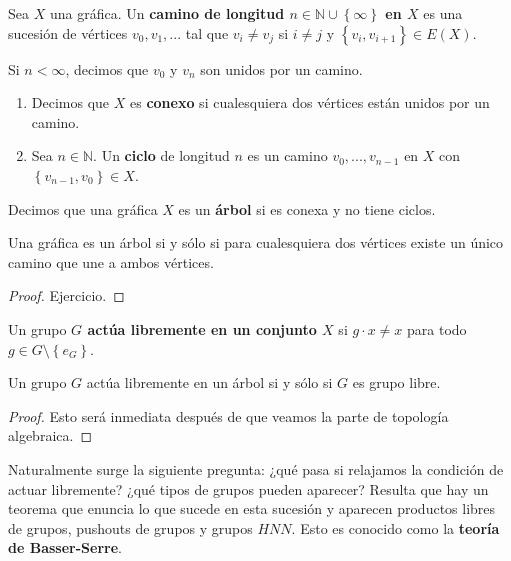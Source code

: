 \documentclass[12pt]{report}
\newcounter{it}
\theoremstyle{largebreak}
\begin{document}
    \begin{mydef}
        Sea $X$ una gráfica. Un \textbf{camino de longitud $n\in\mathbb{N}\cup\left\{\infty\right\}$ en $X$} es una sucesión de vértices $v_0,v_1,...$ tal que $v_i\neq v_j$ si $i\neq j$ y $\left\{v_i,v_{ i+1} \right\}\in E(X)$.

        Si $n<\infty$, decimos que $v_0$ y $v_n$ son unidos por un camino.

        \begin{enumerate}
            \item Decimos que $X$ es \textbf{conexo} si cualesquiera dos vértices están unidos por un camino.
            \item Sea $n\in\mathbb{N}$. Un \textbf{ciclo} de longitud $n$ es un camino $v_0,...,v_{ n-1}$ en $X$ con $\left\{v_{ n-1},v_0 \right\}\in X$.
        \end{enumerate}
    \end{mydef}

    \begin{mydef}
        Decimos que una gráfica $X$ es un \textbf{árbol} si es conexa y no tiene ciclos.
    \end{mydef}

    \begin{propo}
        Una gráfica es un árbol si y sólo si para cualesquiera dos vértices existe un único camino que une a ambos vértices.
    \end{propo}

    \begin{proof}
        Ejercicio.
    \end{proof}

    \begin{mydef}
        Un grupo \textbf{$G$ actúa libremente en un conjunto $X$} si $g\cdot x\neq x$ para todo $g\in G\setminus\left\{e_G\right\}$.
    \end{mydef}

    \begin{theor}
        Un grupo $G$ actúa libremente en un árbol si y sólo si $G$ es grupo libre.
    \end{theor}

    \begin{proof}
        Esto será inmediata después de que veamos la parte de topología algebraica.
    \end{proof}

    Naturalmente surge la siguiente pregunta: ¿qué pasa si relajamos la condición de actuar libremente? ¿qué tipos de grupos pueden aparecer? Resulta que hay un teorema que enuncia lo que sucede en esta sucesión y aparecen productos libres de grupos, pushouts de grupos y grupos $HNN$. Esto es conocido como la \textbf{teoría de Basser-Serre}.
\end{document}
